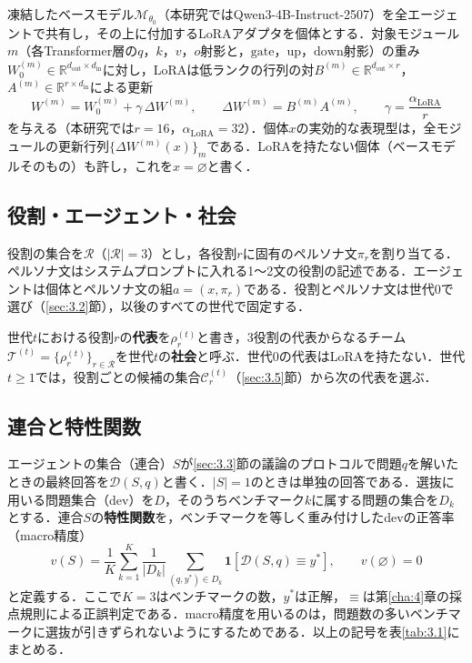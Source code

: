 凍結したベースモデル$\mathcal{M}_{\theta_0}$（本研究ではQwen3-4B-Instruct-2507\cite{qwen2025qwen3}）を全エージェントで共有し，その上に付加するLoRA\cite{hu2021lora}アダプタを個体とする．対象モジュール$m$（各Transformer層の$q$，$k$，$v$，$o$射影と，$\mathrm{gate}$，$\mathrm{up}$，$\mathrm{down}$射影）の重み$W_0^{(m)} \in \mathbb{R}^{d_{\mathrm{out}} \times d_{\mathrm{in}}}$に対し，LoRAは低ランクの行列の対$B^{(m)} \in \mathbb{R}^{d_{\mathrm{out}} \times r}$，$A^{(m)} \in \mathbb{R}^{r \times d_{\mathrm{in}}}$による更新
\begin{equation}
W^{(m)} = W_0^{(m)} + \gamma\, \Delta W^{(m)}, \qquad \Delta W^{(m)} = B^{(m)} A^{(m)}, \qquad \gamma = \frac{\alpha_{\mathrm{LoRA}}}{r}
\label{eq:lora}
\end{equation}
を与える（本研究では$r = 16$，$\alpha_{\mathrm{LoRA}} = 32$）．個体$x$の実効的な表現型は，全モジュールの更新行列$\{\Delta W^{(m)}(x)\}_m$である．LoRAを持たない個体（ベースモデルそのもの）も許し，これを$x = \varnothing$と書く．

\subsection{役割・エージェント・社会}
\label{sec:3.1.2}

役割の集合を$\mathcal{R}$（$|\mathcal{R}| = 3$）とし，各役割$r$に固有のペルソナ文$\pi_r$を割り当てる．ペルソナ文はシステムプロンプトに入れる1〜2文の役割の記述である．エージェントは個体とペルソナ文の組$a = (x, \pi_r)$である．役割とペルソナ文は世代0で選び（\ref{sec:3.2}節），以後のすべての世代で固定する．

世代$t$における役割$r$の\textbf{代表}を$\rho_r^{(t)}$と書き，3役割の代表からなるチーム$\mathcal{T}^{(t)} = \{\rho_r^{(t)}\}_{r \in \mathcal{R}}$を世代$t$の\textbf{社会}と呼ぶ．世代0の代表はLoRAを持たない．世代$t \geq 1$では，役割ごとの候補の集合$\mathcal{C}_r^{(t)}$（\ref{sec:3.5}節）から次の代表を選ぶ．

\subsection{連合と特性関数}
\label{sec:3.1.3}

エージェントの集合（連合）$S$が\ref{sec:3.3}節の議論のプロトコルで問題$q$を解いたときの最終回答を$\mathcal{D}(S, q)$と書く．$|S| = 1$のときは単独の回答である．選抜に用いる問題集合（dev）を$D$，そのうちベンチマーク$k$に属する問題の集合を$D_k$とする．連合$S$の\textbf{特性関数}を，ベンチマークを等しく重み付けしたdevの正答率（macro精度）
\begin{equation}
v(S) = \frac{1}{K} \sum_{k=1}^{K} \frac{1}{|D_k|} \sum_{(q, y^*) \in D_k} \mathbf{1}\left[\mathcal{D}(S, q) \equiv y^*\right], \qquad v(\varnothing) = 0
\label{eq:charfun}
\end{equation}
と定義する．ここで$K = 3$はベンチマークの数，$y^*$は正解，$\equiv$は第\ref{cha:4}章の採点規則による正誤判定である．macro精度を用いるのは，問題数の多いベンチマークに選抜が引きずられないようにするためである．以上の記号を表\ref{tab:3.1}にまとめる．

